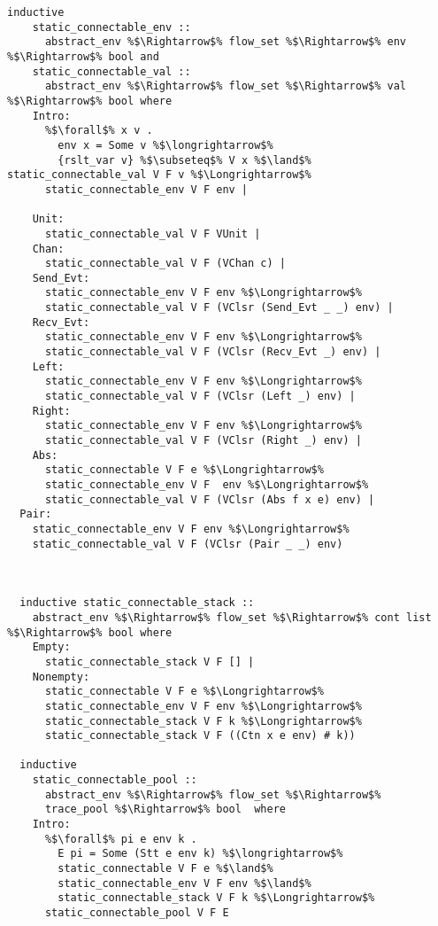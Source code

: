 \documentclass{article}
\begin{document}
\begin{lstlisting}[style=codestyle1, escapechar=\%]
  inductive 
    static_connectable_env ::
      abstract_env %$\Rightarrow$% flow_set %$\Rightarrow$% env %$\Rightarrow$% bool and
    static_connectable_val ::
      abstract_env %$\Rightarrow$% flow_set %$\Rightarrow$% val %$\Rightarrow$% bool where
    Intro:
      %$\forall$% x v .
        env x = Some v %$\longrightarrow$%
        {rslt_var v} %$\subseteq$% V x %$\land$% static_connectable_val V F v %$\Longrightarrow$%
      static_connectable_env V F env |

    Unit:
      static_connectable_val V F VUnit |
    Chan:
      static_connectable_val V F (VChan c) |
    Send_Evt:
      static_connectable_env V F env %$\Longrightarrow$%
      static_connectable_val V F (VClsr (Send_Evt _ _) env) |
    Recv_Evt:
      static_connectable_env V F env %$\Longrightarrow$%
      static_connectable_val V F (VClsr (Recv_Evt _) env) |
    Left:
      static_connectable_env V F env %$\Longrightarrow$%
      static_connectable_val V F (VClsr (Left _) env) |
    Right:
      static_connectable_env V F env %$\Longrightarrow$%
      static_connectable_val V F (VClsr (Right _) env) |
    Abs:
      static_connectable V F e %$\Longrightarrow$% 
      static_connectable_env V F  env %$\Longrightarrow$%
      static_connectable_val V F (VClsr (Abs f x e) env) |
  Pair:
    static_connectable_env V F env %$\Longrightarrow$%
    static_connectable_val V F (VClsr (Pair _ _) env) 



  inductive static_connectable_stack ::
    abstract_env %$\Rightarrow$% flow_set %$\Rightarrow$% cont list %$\Rightarrow$% bool where
    Empty:
      static_connectable_stack V F [] |
    Nonempty:
      static_connectable V F e %$\Longrightarrow$%
      static_connectable_env V F env %$\Longrightarrow$%
      static_connectable_stack V F k %$\Longrightarrow$% 
      static_connectable_stack V F ((Ctn x e env) # k))

  inductive
    static_connectable_pool ::
      abstract_env %$\Rightarrow$% flow_set %$\Rightarrow$%
      trace_pool %$\Rightarrow$% bool  where
    Intro:
      %$\forall$% pi e env k .
        E pi = Some (Stt e env k) %$\longrightarrow$% 
        static_connectable V F e %$\land$%
        static_connectable_env V F env %$\land$%
        static_connectable_stack V F k %$\Longrightarrow$% 
      static_connectable_pool V F E

  \end{lstlisting}
\end{document}
